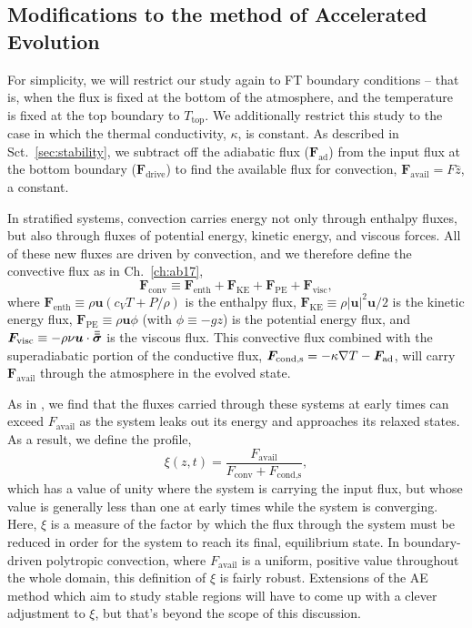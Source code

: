 \subsection{Modifications to the method of Accelerated Evolution}
\label{sec:ae}
For simplicity, we will restrict our study again to FT boundary conditions -- that is, when the flux is fixed at the bottom of the atmosphere, and the temperature is fixed at the top boundary to $T_{\text{top}}$.
We additionally restrict this study to the case in which the thermal conductivity, $\kappa$, is constant.
As described in Sct.~\ref{sec:stability}, we subtract off the adiabatic flux ($\bm{F}_{\text{ad}}$) from the input flux at the bottom boundary ($\bm{F}_{\text{drive}}$) to find the available flux for convection, $\bm{F}_{\text{avail}} = F \hat{z}$, a constant.

In stratified systems, convection carries energy not only through enthalpy fluxes, but also through fluxes of potential energy, kinetic energy, and viscous forces.
All of these new fluxes are driven by convection, and we therefore define the convective flux as in Ch.~\ref{ch:ab17},
\begin{equation}
\bm{F}_{\text{conv}} \equiv \bm{F}_{\text{enth}} + \bm{F}_{\text{KE}} + \bm{F}_{\text{PE}} + \bm{F}_{\text{visc}},
\end{equation}
where $\bm{F}_{\text{enth}} \equiv \rho\bm{u}(c_V T + P/\rho)$ is the enthalpy flux, $\bm{F}_{\text{KE}} \equiv \rho|\bm{u}|^2\bm{u}/2$ is the kinetic energy flux, $\bm{F}_{\text{PE}} \equiv \rho\bm{u}\phi$ (with $\phi \equiv -gz$) is the potential energy flux, and $\bm{F}_{\text{visc}} \equiv -\rho\nu\bm{u}\cdot\bm{\bar{\bar{\sigma}}}$ is the viscous flux.
This convective flux combined with the superadiabatic portion of the conductive flux, $\bm{F}_{\text{cond,s}} = -\kappa \nabla T - \bm{F}_{\text{ad}}$, will carry $\bm{F}_{\text{avail}}$ through the atmosphere in the evolved state.

As in \citet{anders&all2018}, we find that the fluxes carried through these systems at early times can exceed $F_{\text{avail}}$ as the system leaks out its energy and approaches its relaxed states.
As a result, we define the profile,
\begin{equation}
\xi(z, t) = \frac{F_{\text{avail}}}{F_{\text{conv}} + F_{\text{cond,s}}},
\label{eqn:xi}
\end{equation}
which has a value of unity where the system is carrying the input flux, but whose value is generally less than one at early times while the system is converging.
Here, $\xi$ is a measure of the factor by which the flux through the system must be reduced in order for the system to reach its final, equilibrium state.
In boundary-driven polytropic convection, where $F_{\text{avail}}$ is a uniform, positive value throughout the whole domain, this definition of $\xi$ is fairly robust.
Extensions of the AE method which aim to study stable regions will have to come up with a clever adjustment to $\xi$, but that's beyond the scope of this discussion.

